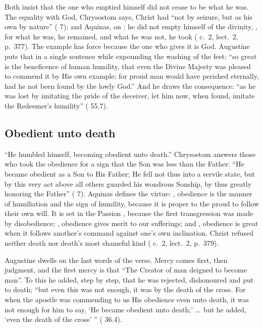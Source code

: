 Both insist that the one who emptied himself did not cease to be what he was.
The equality with God, Chrysostom says, Christ had ``not by seizure, but as his
own by nature'' ( 7); and Aquinas, on : he did not empty
himself of the divinity, , for what he was, he remained, and what he was not, he took
( c.~2, lect.~2, p.~377). The example has force because
the one who gives it is God. Augustine puts that in a single sentence while
expounding the washing of the feet: ``so great is the beneficence of human
humility, that even the Divine Majesty was pleased to commend it by His own
example; for proud man would have perished eternally, had he not been found by
the lowly God.'' And he draws the consequence: ``as he was lost by imitating
the pride of the deceiver, let him now, when found, imitate the Redeemer's
humility'' ( 55.7).

\subsection{Obedient unto death}

``He humbled himself, becoming obedient unto death.'' Chrysostom answers those
who took the obedience for a sign that the Son was less than the Father: ``He
became obedient as a Son to His Father; He fell not thus into a servile state,
but by this very act above all others guarded his wondrous Sonship, by thus
greatly honoring the Father'' ( 7). Aquinas
defines the virtue: , obedience
is the manner of humiliation and the sign of humility, because it is proper to
the proud to follow their own will. It is set in the Passion , because the first transgression was
made by disobedience; ,
obedience gives merit to our sufferings; and , obedience is great
when it follows another's command against one's own inclination. Christ refused
neither death nor death's most shameful kind ( c.~2,
lect.~2, p.~379).

Augustine dwells on the last words of the verse. Mercy comes first, then
judgment, and the first mercy is that ``The Creator of man deigned to become
man''. To this he added, step by step, that he was rejected, dishonoured and
put to death; ``but even this was not enough, it was by the death of the
cross. For when the apostle was commending to us His obedience even unto death,
it was not enough for him to say, `He became obedient unto death;' \ldots\ but
he added, `even the death of the cross' '' ( 36.4).

